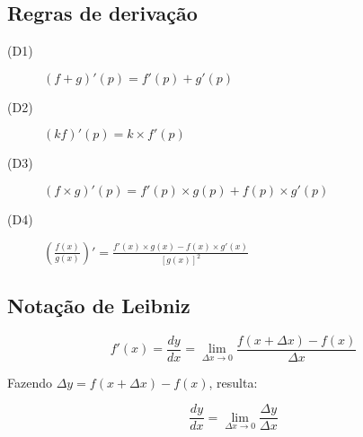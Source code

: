 \documentclass[11pt]{article}
\newcommand{\limit}[3]{{
  \underset{#1 \rightarrow #2}{\lim} #3
}}
\begin{document}
\subsection{Regras de derivação}

\begin{description}
  \item[(D1)] $(f+g)'(p) = f'(p) + g'(p)$
  \item[(D2)] $(kf)'(p) = k\times f'(p)$
  \item[(D3)] $(f\times g)'(p) = f'(p)\times g(p) + f(p)\times g'(p)$
  \item[(D4)] $( \frac{f(x)}{g(x)} )' = \frac{f'(x)\times g(x) - f(x)\times
    g'(x)}{[g(x)]^2}$
\end{description}

\subsection{Notação de Leibniz}

$$
f'(x) = \frac{dy}{dx} = \limit{\Delta x}{0}{ \frac{f(x + \Delta x) -
f(x)}{\Delta x} }
$$

Fazendo $\Delta y = f(x+ \Delta x)-f(x)$, resulta:

$$
\frac{dy}{dx} = \limit{\Delta x}{0}{ \frac{\Delta y}{\Delta x} }
$$
\end{document}
